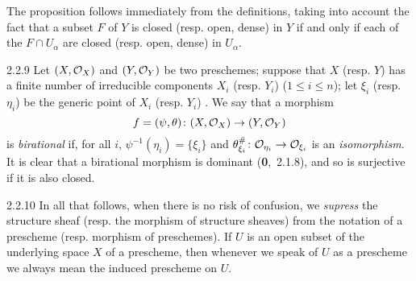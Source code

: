 The proposition follows immediately from the definitions, taking into
account the fact that a subset $F$ of $Y$ is closed (resp. open, dense) in $Y$
if and only if each of the $F\cap U_\alpha$ are closed (resp. open, dense) in
$U_\alpha$.

\begin{env}{2.2.9}
Let $(X,\mathcal{O}_X)$ and $(Y,\mathcal{O}_Y)$ be two preschemes; suppose that
$X$ (resp. $Y$) has a finite number of irreducible components $X_i$ (resp.
$Y_i$) ($1\leqslant i\leqslant n$); let $\xi_i$ (resp. $\eta_i$) be the generic
point of $X_i$ (resp. $Y_i$) . We say that a morphism
\[
  f=(\psi,\theta)\colon(X,\mathcal{O}_X)\to(Y,\mathcal{O}_Y)
\]
is \emph{birational}
if, for all $i$, $\psi^{-1}(\eta_i)=\{\xi_i\}$ and
$\theta_{\xi_i}^\#\colon\mathcal{O}_{\eta_i}\to\mathcal{O}_{\xi_i}$ is an \emph{isomorphism}. It
is clear that a birational morphism is dominant (\textbf{0},~2.1.8), and so is
surjective if it is also closed.
\end{env}

\begin{env}{2.2.10}
In all that follows, when there is
no risk of confusion, we \emph{supress} the structure sheaf (resp. the morphism
of structure sheaves) from the notation of a prescheme (resp. morphism of
preschemes). If $U$ is an open subset of the underlying space $X$ of a
prescheme, then whenever we speak of $U$ as a prescheme we always mean the
induced prescheme on $U$.
\end{env}

